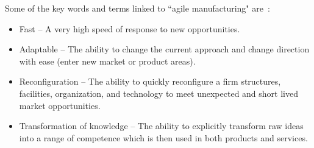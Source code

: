 \documentclass[final,12pt]{elsarticle}
\begin{document}
Some of the key words and terms linked to ``agile manufacturing" are~\cite{KIDD.2000}:
\begin{itemize}
\item Fast -- A very high speed of response to new opportunities.
\item Adaptable -- The ability to change the current approach and change direction with ease (enter new market or product areas).
\item Reconfiguration -- The ability to quickly reconfigure a firm structures, facilities, organization, and technology to meet unexpected and short lived market opportunities.
\item Transformation of knowledge -- The ability to explicitly transform raw ideas into a range of competence which is then used in both products and services.
\end{itemize}









\end{document}
